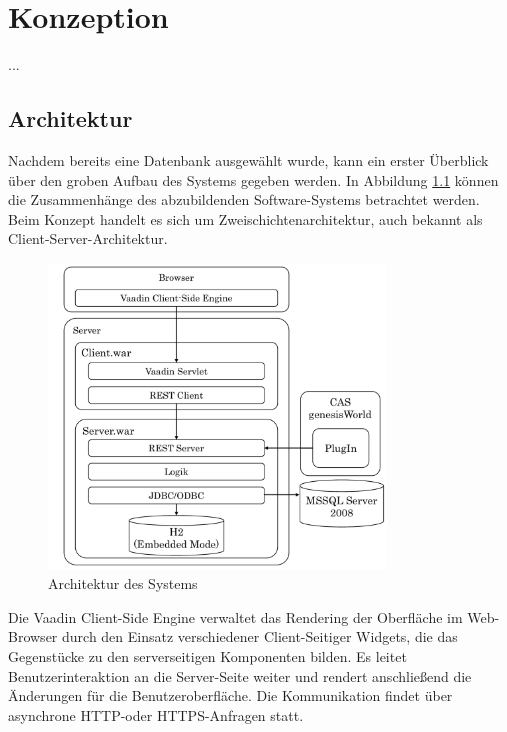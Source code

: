 
\chapter{Konzeption}

...

\section{Architektur}

Nachdem bereits eine Datenbank ausgewählt wurde, kann ein erster Überblick über den groben Aufbau des Systems gegeben werden. In Abbildung \ref{konzept_architektur} können die Zusammenhänge des abzubildenden Software-Systems betrachtet werden. Beim Konzept handelt es sich um Zweischichtenarchitektur, auch bekannt als Client-Server-Architektur.   

\begin{figure}[htbp]
\centering
  \includegraphics[width=0.8\textwidth, width=0.8\textwidth]{pics/Konzept_architektur.pdf}
\caption{Architektur des Systems}
\label{konzept_architektur}
\end{figure} 

Die Vaadin Client-Side Engine verwaltet das Rendering der Oberfläche im Web-Browser durch den Einsatz verschiedener Client-Seitiger Widgets, die das Gegenstücke zu den serverseitigen Komponenten bilden. Es leitet Benutzerinteraktion an die Server-Seite weiter und rendert anschließend die Änderungen für die Benutzeroberfläche. Die Kommunikation findet über asynchrone HTTP-oder HTTPS-Anfragen statt.


